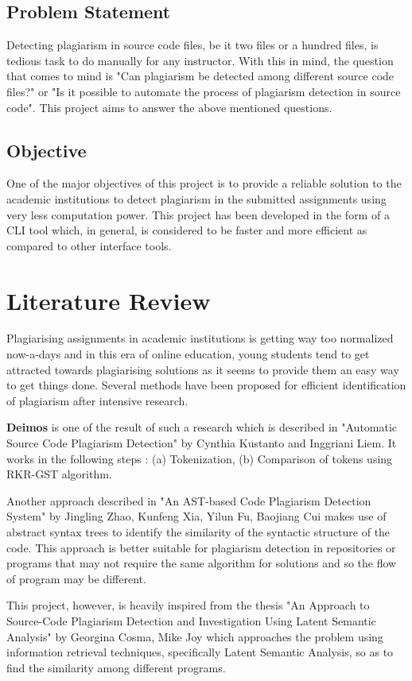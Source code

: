 \documentclass[12pt]{article}
\begin{document}
\subsection{Problem Statement}
Detecting plagiarism in source code files, be it two files or a hundred files, is tedious task to do manually for any instructor. With this in mind, the question that comes to mind is "Can plagiarism be detected among different source code files?" or "Is it possible to automate the process of plagiarism detection in source code". This project aims to answer the above mentioned questions.

\subsection{Objective}
One of the major objectives of this project is to provide a reliable solution to the academic institutions to detect plagiarism in the submitted assignments using very less computation power. This project has been developed in the form of a CLI tool which, in general, is considered to be faster and more efficient as compared to other interface tools. \par


\section{Literature Review}
Plagiarising assignments in academic institutions is getting way too normalized now-a-days and in this era of online education, young students tend to get attracted towards plagiarising solutions as it seems to provide them an easy way to get things done. Several methods have been proposed for efficient identification of plagiarism after intensive research. \par \textbf{Deimos} is one of the result of such a research which is described in "Automatic Source Code Plagiarism Detection" by Cynthia Kustanto and Inggriani Liem. It works in the following steps : (a) Tokenization, (b) Comparison of tokens using RKR-GST  algorithm. \par
Another approach described in "An AST-based Code Plagiarism Detection System" by Jingling Zhao, Kunfeng Xia, Yilun Fu, Baojiang Cui makes use of abstract syntax trees to identify the similarity of the syntactic structure of the code. This approach is better suitable for plagiarism detection in repositories or programs that may not require the same algorithm for solutions and so the flow of program may be different. \par
This project, however, is heavily inspired from the thesis "An Approach to Source-Code Plagiarism Detection and Investigation Using Latent Semantic Analysis" by Georgina Cosma, Mike Joy which approaches the problem using information retrieval techniques, specifically Latent Semantic Analysis, so as to find the similarity among different programs.
\end{document}
